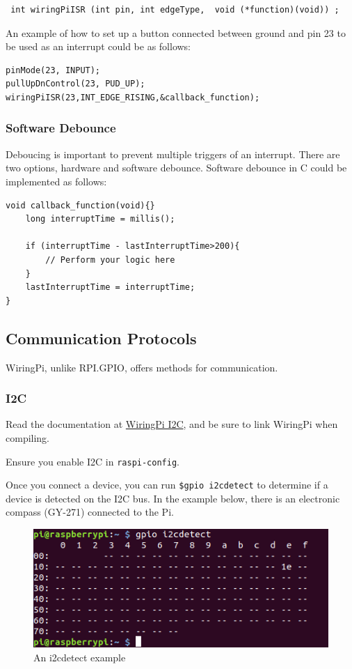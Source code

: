 \begin{lstlisting}
 int wiringPiISR (int pin, int edgeType,  void (*function)(void)) ;
\end{lstlisting}

An example of how to set up a button connected between ground and pin 23 to be used as an interrupt could be as follows:
\begin{lstlisting}
pinMode(23, INPUT); 
pullUpDnControl(23, PUD_UP);
wiringPiISR(23,INT_EDGE_RISING,&callback_function);
\end{lstlisting}

\subsubsection{Software Debounce}
Deboucing is important to prevent multiple triggers of an interrupt. There are two options, hardware and software debounce. Software debounce in C could be implemented as follows:

\begin{lstlisting}
void callback_function(void){}
    long interruptTime = millis();
	
    if (interruptTime - lastInterruptTime>200){
        // Perform your logic here		
    }
    lastInterruptTime = interruptTime;
}
\end{lstlisting}

\subsection{Communication Protocols}
WiringPi, unlike RPI.GPIO, offers methods for communication. 

\subsubsection{I2C}
Read the documentation at \href{http://wiringpi.com/reference/i2c-library/}{WiringPi I2C}, and be sure to link WiringPi when compiling.

Ensure you enable I2C in \verb|raspi-config|.

Once you connect a device, you can run \verb|$gpio i2cdetect| to determine if a device is detected on the I2C bus. In the example below, there is an electronic compass (GY-271) connected to the Pi.
\begin{figure}[H]
\centering
\includegraphics[width=0.7\columnwidth]{Figures/i2cdetect}
\caption{An i2cdetect example}
\end{figure}

